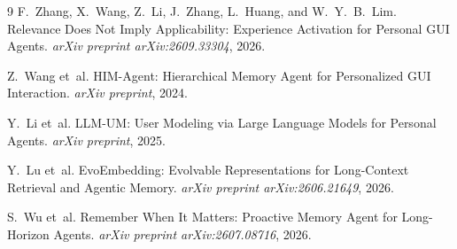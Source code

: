 \documentclass[11pt,a4paper]{article}
\begin{document}
\begin{thebibliography}{9}
F.~Zhang, X.~Wang, Z.~Li, J.~Zhang, L.~Huang, and W.~Y.~B.~Lim.
\newblock Relevance Does Not Imply Applicability: Experience Activation for Personal GUI Agents.
\newblock \emph{arXiv preprint arXiv:2609.33304}, 2026.

Z.~Wang et~al.
\newblock HIM-Agent: Hierarchical Memory Agent for Personalized GUI Interaction.
\newblock \emph{arXiv preprint}, 2024.

Y.~Li et~al.
\newblock LLM-UM: User Modeling via Large Language Models for Personal Agents.
\newblock \emph{arXiv preprint}, 2025.

Y.~Lu et~al.
\newblock EvoEmbedding: Evolvable Representations for Long-Context Retrieval and Agentic Memory.
\newblock \emph{arXiv preprint arXiv:2606.21649}, 2026.

S.~Wu et~al.
\newblock Remember When It Matters: Proactive Memory Agent for Long-Horizon Agents.
\newblock \emph{arXiv preprint arXiv:2607.08716}, 2026.
\end{thebibliography}
\end{document}
